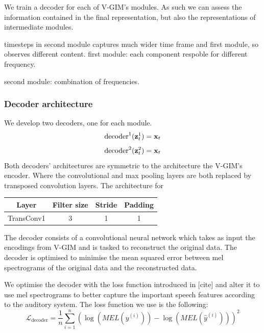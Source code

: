 		We train a decoder for each of V-GIM's modules. As such we can assess the information contained in the final representation, but also the representations of intermediate modules.
		
		timesteps in second module captures much wider time frame and first module, so observes different content.
		first module: each component respoble for different frequency.
		
		second module:
		combination of frequencies.
		
		\subsubsection{Decoder architecture}
		We develop two decoders, one for each module. 
		$$
			\text{decoder}^1(\mathbf{z}_t^1) = \mathbf{x}_t
		$$
		$$
			\text{decoder}^2(\mathbf{z}_t^2) = \mathbf{x}_t
		$$
		Both decoders' architectures are symmetric to the architecture the V-GIM's encoder. Where the convolutional and max pooling layers are both replaced by transposed convolution layers.
		The architecture for 
		
		\begin{tabular}{|c|c|c|c|}
			\hline
			Layer & Filter size & Stride & Padding \\
			\hline
			TransConv1 & 3 & 1 & 1 \\
			\hline
		\end{tabular}
	
	
	
		The decoder consists of a convolutional neural network which takes as input the encodings from V-GIM and is tasked to reconstruct the original data. The decoder is optimised to minimise the mean squared error between mel spectrograms of the original data and the reconstructed data. 
		
		We optimise the decoder with the loss function introduced in [cite] and alter it to use mel spectrograms to better capture the important speech features according to the auditory system. The loss function we use is the following:
		$$
		\mathcal{L}_{\text{decoder}} =\frac{1}{n} \sum_{i=1}^n\left( \log (MEL(y^{(i)})) -\log (MEL(\hat{y} ^{(i)} )) \right)^2
		$$
		
		
	
	
	
	
	
